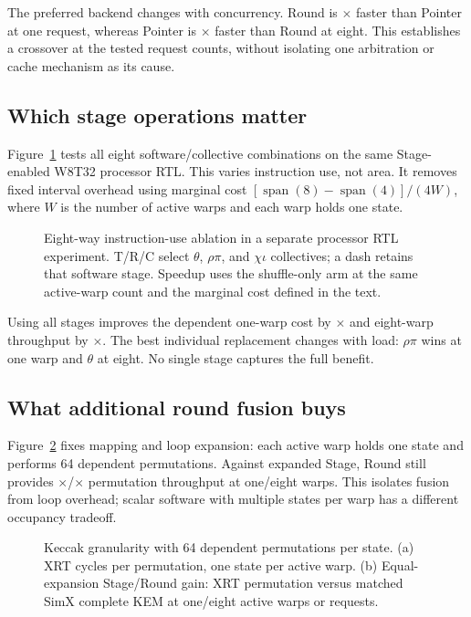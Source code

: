 \documentclass[conference,letterpaper]{IEEEtran}
\begin{document}
The preferred backend changes with concurrency. Round is
\RoundVsPointerOne{}$\times$ faster than Pointer at one request, whereas
Pointer is \PointerVsRoundEight{}$\times$ faster than Round at eight.
This establishes a crossover at the tested request counts, without
isolating one arbitration or cache mechanism as its cause.

\subsection{Which stage operations matter}
Figure~\ref{fig:ablation} tests all eight software/collective combinations
on the same Stage-enabled W8T32 processor RTL. This varies instruction use,
not area. It removes fixed interval overhead using marginal cost
$[\operatorname{span}(8)-\operatorname{span}(4)]/(4W)$, where $W$ is the
number of active warps and each warp holds one state.

\begin{figure}[t]
\centering
\caption{Eight-way instruction-use ablation in a separate processor RTL
experiment. T/R/C select $\theta$, $\rho\pi$, and $\chi\iota$ collectives;
a dash retains that software stage. Speedup uses the shuffle-only arm at
the same active-warp count and the marginal cost defined in the text.}
\label{fig:ablation}
\end{figure}

Using all stages improves the dependent one-warp cost by
\AllStageOne{}$\times$ and eight-warp throughput by
\AllStageEight{}$\times$. The best individual replacement changes with
load: $\rho\pi$ wins at one warp and $\theta$ at eight. No single stage
captures the full benefit.

\subsection{What additional round fusion buys}
Figure~\ref{fig:fusion} fixes mapping and loop expansion: each active warp
holds one state and performs 64 dependent permutations. Against expanded
Stage, Round still provides \FusionOne{}$\times$/\FusionEight{}$\times$
permutation throughput at one/eight warps. This isolates fusion from loop
overhead; scalar software with multiple states per warp has a different
occupancy tradeoff.

\begin{figure}[t]
\centering
\caption{Keccak granularity with 64 dependent permutations per state.
(a) XRT cycles per permutation, one state per active warp.
(b) Equal-expansion Stage/Round gain: XRT permutation versus matched
SimX complete KEM at one/eight active warps or requests.}
\label{fig:fusion}
\end{figure}
\end{document}
